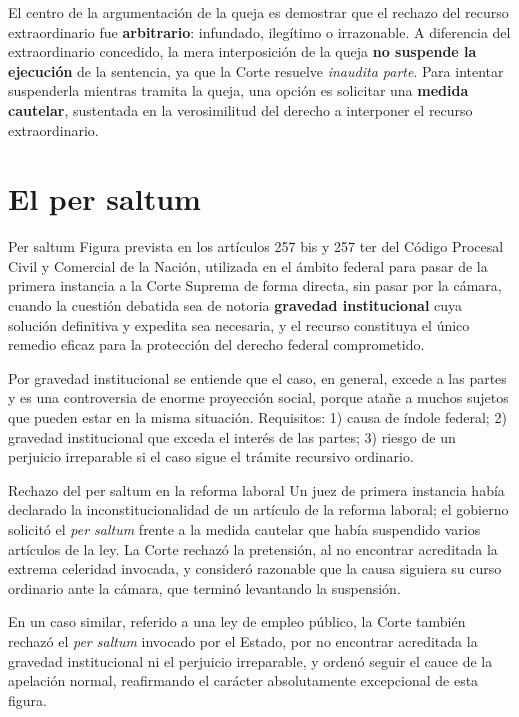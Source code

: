 \documentclass[12pt,oneside]{book}
\begin{document}
El centro de la argumentación de la queja es demostrar que el rechazo del recurso extraordinario fue \textbf{arbitrario}: infundado, ilegítimo o irrazonable. A diferencia del extraordinario concedido, la mera interposición de la queja \textbf{no suspende la ejecución} de la sentencia, ya que la Corte resuelve \textit{inaudita parte}. Para intentar suspenderla mientras tramita la queja, una opción es solicitar una \textbf{medida cautelar}, sustentada en la verosimilitud del derecho a interponer el recurso extraordinario.

\section{El per saltum}

\begin{definition}{Per saltum}
Figura prevista en los artículos 257 bis y 257 ter del Código Procesal Civil y Comercial de la Nación, utilizada en el ámbito federal para pasar de la primera instancia a la Corte Suprema de forma directa, sin pasar por la cámara, cuando la cuestión debatida sea de notoria \textbf{gravedad institucional} cuya solución definitiva y expedita sea necesaria, y el recurso constituya el único remedio eficaz para la protección del derecho federal comprometido.
\end{definition}

Por gravedad institucional se entiende que el caso, en general, excede a las partes y es una controversia de enorme proyección social, porque atañe a muchos sujetos que pueden estar en la misma situación. Requisitos: 1) causa de índole federal; 2) gravedad institucional que exceda el interés de las partes; 3) riesgo de un perjuicio irreparable si el caso sigue el trámite recursivo ordinario.

\begin{example}{Rechazo del per saltum en la reforma laboral}
Un juez de primera instancia había declarado la inconstitucionalidad de un artículo de la reforma laboral; el gobierno solicitó el \textit{per saltum} frente a la medida cautelar que había suspendido varios artículos de la ley. La Corte rechazó la pretensión, al no encontrar acreditada la extrema celeridad invocada, y consideró razonable que la causa siguiera su curso ordinario ante la cámara, que terminó levantando la suspensión.
\end{example}

\begin{note}
En un caso similar, referido a una ley de empleo público, la Corte también rechazó el \textit{per saltum} invocado por el Estado, por no encontrar acreditada la gravedad institucional ni el perjuicio irreparable, y ordenó seguir el cauce de la apelación normal, reafirmando el carácter absolutamente excepcional de esta figura.
\end{note}
\end{document}
